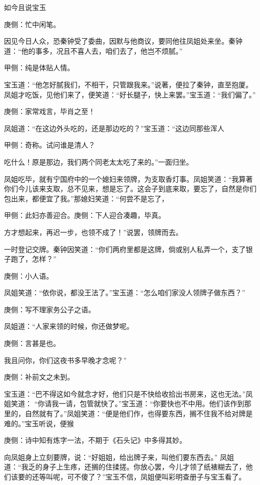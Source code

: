 \begin{parag}
    如今且说宝玉\begin{note}庚侧：忙中闲笔。\end{note}因见今日人众，恐秦钟受了委曲，因默与他商议，要同他往凤姐处来坐。秦钟道：“他的事多，况且不喜人去，咱们去了，他岂不烦腻。”\begin{note}甲侧：纯是体贴人情。\end{note}宝玉道：“他怎好腻我们，不相干，只管跟我来。”说著，便拉了秦钟，直至抱厦。凤姐才吃饭，见他们来了，便笑道：“好长腿子，快上来罢。”宝玉道：“我们偏了。”\begin{note}庚侧：家常戏言，毕肖之至！\end{note}凤姐道：“在这边外头吃的，还是那边吃的？”宝玉道：“这边同那些浑人\begin{note}甲侧：奇称。试问谁是清人？\end{note}吃什么！原是那边，我们两个同老太太吃了来的。”一面归坐。
\end{parag}


\begin{parag}
    凤姐吃毕，就有宁国府中的一个媳妇来领牌，为支取香灯事。凤姐笑道：“我算著你们今儿该来支取，总不见来，想是忘了。这会子到底来取，要忘了，自然是你们包出来，都便宜了我。”那媳妇笑道：“何尝不是忘了，\begin{note}甲侧：此妇亦善迎合。庚侧：下人迎合凑趣，毕真。\end{note}方才想起来，再迟一步，也领不成了！”说罢，领牌而去。
\end{parag}


\begin{parag}
    一时登记交牌。秦钟因笑道：“你们两府里都是这牌，倘或别人私弄一个，支了银子跑了，怎样？”\begin{note}庚侧：小人语。\end{note}凤姐笑道：“依你说，都没王法了。”宝玉道：“怎么咱们家没人领牌子做东西？”\begin{note}庚侧：写不理家务公子之语。\end{note}凤姐道：“人家来领的时候，你还做梦呢。\begin{note}庚侧：言甚是也。\end{note}我且问你，你们这夜书多早晚才念呢？”\begin{note}庚侧：补前文之未到。\end{note}宝玉道：“巴不得这如今就念才好，他们只是不快给收拾出书房来，这也无法。”凤姐笑道： “你请我一请，包管就快了。”宝玉道：“你要快也不中用。他们该作到那里的，自然就有了。”凤姐笑道：“便是他们作，也得要东西，搁不住我不给对牌是难的。”宝玉听说，便猴\begin{note}庚侧：诗中知有炼字一法，不期于《石头记》中多得其妙。\end{note}向凤姐身上立刻要牌，说：“好姐姐，给出牌子来，叫他们要东西去。” 凤姐道：“我乏的身子上生疼，还搁的住揉搓。你放心罢，今儿才领了纸裱糊去了，他们该要的还等叫呢，可不傻了？”宝玉不信，凤姐便叫彩明查册子与宝玉看了。
\end{parag}


